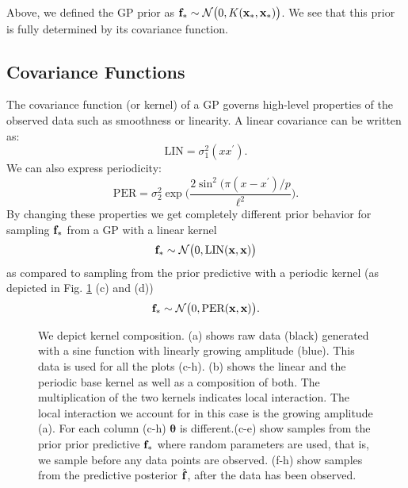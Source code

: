 Above, we defined the \ac{GP} prior as $\mathbf{f}_* \sim \mathcal{N}\big(0,K(\mathbf{x}_*,\mathbf{x}_*)\big)$.
We see that this prior is fully determined by its covariance function.
\subsection{Covariance Functions}
The covariance function (or kernel) of a \ac{GP} governs high-level properties of the observed data such as smoothness or linearity. A linear covariance can be written as:
\begin{equation}\label{eq:LIN1}
    \text{LIN} =   \sigma_1^2(x x^\prime).
\end{equation}
We can also express periodicity:
\begin{equation}\label{eq:PER1}
    \text{PER} =  \sigma_2^2 \exp \bigg( \frac{2 \sin^2 ( \pi (x - x^\prime)/p}{\ell^2} \bigg). 
\end{equation}
By changing these properties we get completely different prior behavior for sampling $\mathbf{f}_*$ from a
\ac{GP} with a linear kernel
\[
\mathbf{f}_* \sim \mathcal{N}\big(0,\text{LIN}(\mathbf{x},\mathbf{x})\big)
\]
as compared to sampling from the prior predictive with a periodic kernel (as depicted in 
Fig. \ref{fig:composition_tutorial} (c) and (d))
\[
\mathbf{f}_* \sim \mathcal{N}\big(0,\text{PER}(\mathbf{x},\mathbf{x})\big).
\]
\begin{figure}

\caption{We depict kernel composition. 
(a) shows raw data (black) generated with a sine function with linearly growing amplitude (blue).
This data is used for all the plots (c-h). 
(b) shows the linear and the periodic base kernel as well as a composition of both. 
The multiplication of the two kernels indicates local interaction. The local interaction we account for in this case is the growing amplitude (a). For each column (c-h) $\bm{\theta}$ is different.(c-e) show samples from the prior
prior predictive $\mathbf{f}_*$ where random parameters are used, that is, we sample before any data points are observed.
(f-h) show samples from the predictive posterior $\hat{\mathbf{f}}$, after the data has been observed.}
\label{fig:composition_tutorial}
\end{figure}
